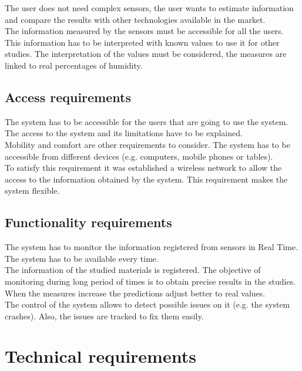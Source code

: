 The user does not need complex sensors, the user wants to estimate information and compare the results with other technologies available in the market.\\

The information measured by the sensors must be accessible for all the users. This information has to be interpreted with known values to use it for other studies. The interpretation of the values must be considered, the measures are linked to real percentages of humidity.

\subsection{Access requirements}

The system has to be accessible for the users that are going to use the system. The access to the system and its limitations have to be explained.\\

Mobility and comfort are other requirements to consider. The system has to be accessible from different devices (e.g. computers, mobile phones or tables).\\

To satisfy this requirement it was established a wireless network to allow the access to the information obtained by the system. This requirement makes the system flexible.

\subsection{Functionality requirements}

The system has to monitor the information registered from sensors in Real Time. The system has to be available every time.\\

The information of the studied materials is registered. The objective of monitoring during long period of times is to obtain precise results in the studies. When the measures increase the predictions adjust better to real values.\\

The control of the system allows to detect possible issues on it (e.g. the system crashes). Also, the issues are tracked to fix them easily.

\section{Technical requirements}

